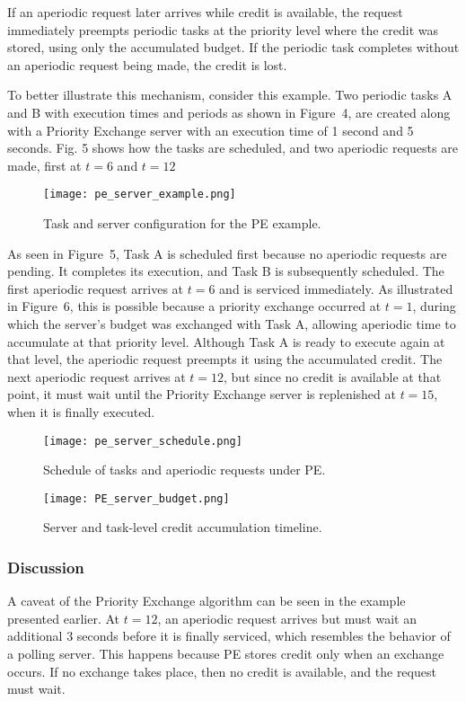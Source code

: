 \documentclass[conference]{IEEEtran}
\begin{document}
If an aperiodic request later arrives while credit is available, the request immediately preempts periodic tasks at the priority level where the credit was stored, using only the accumulated budget. If the periodic task completes without an aperiodic request being made, the credit is lost.

To better illustrate this mechanism, consider this example. Two periodic tasks A and B with execution times and periods as shown in Figure~4, are created along with a Priority Exchange server with an execution time of 1 second and 5 seconds. Fig. 5 shows how the tasks are scheduled, and two aperiodic requests are made, first at $t = 6$ and $t = 12$

\begin{figure}[H]
    \centering
    \texttt{[image: pe\_server\_example.png]}
    \caption{Task and server configuration for the PE example.}
    \label{fig:polling}
\end{figure}
As seen in Figure~5, Task A is scheduled first because no aperiodic requests are pending. It completes its execution, and Task B is subsequently scheduled. The first aperiodic request arrives at $t = 6$ and is serviced immediately. As illustrated in Figure~6, this is possible because a priority exchange occurred at $t = 1$, during which the server's budget was exchanged with Task A, allowing aperiodic time to accumulate at that priority level. Although Task A is ready to execute again at that level, the aperiodic request preempts it using the accumulated credit. The next aperiodic request arrives at $t = 12$, but since no credit is available at that point, it must wait until the Priority Exchange server is replenished at $t = 15$, when it is finally executed.

\begin{figure}[H]
    \centering
    \texttt{[image: pe\_server\_schedule.png]}
    \caption{Schedule of tasks and aperiodic requests under PE.}
    \label{fig:polling}
\end{figure}

\begin{figure}[H]
    \centering
    \texttt{[image: PE\_server\_budget.png]}
    \caption{Server and task-level credit accumulation timeline.}
    \label{fig:polling}
\end{figure}

\subsubsection*{Discussion}
A caveat of the Priority Exchange algorithm can be seen in the example presented earlier. At $t = 12$, an aperiodic request arrives but must wait an additional 3 seconds before it is finally serviced, which resembles the behavior of a polling server. This happens because PE stores credit only when an exchange occurs. If no exchange takes place, then no credit is available, and the request must wait. 
\end{document}
